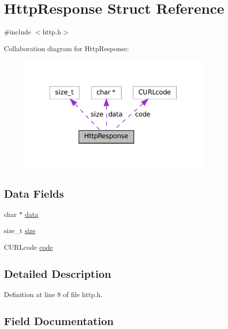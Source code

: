 \hypertarget{struct_http_response}{}\section{Http\+Response Struct Reference}
\label{struct_http_response}


{\ttfamily \#include $<$http.\+h$>$}



Collaboration diagram for Http\+Response\+:
\nopagebreak
\begin{figure}[H]
\begin{center}
\leavevmode
\includegraphics[width=274pt]{struct_http_response__coll__graph}
\end{center}
\end{figure}
\subsection*{Data Fields}
\begin{DoxyCompactItemize}
\item 
char $\ast$ \mbox{\hyperlink{struct_http_response_a29b7ecfb11da1af6c7fdd3fe7862901f}{data}}
\item 
size\+\_\+t \mbox{\hyperlink{struct_http_response_a11b910682b365528a15fcfd6d4dd824f}{size}}
\item 
C\+U\+R\+Lcode \mbox{\hyperlink{struct_http_response_abce68ae6776a536dce762f0b6a96ab54}{code}}
\end{DoxyCompactItemize}


\subsection{Detailed Description}


Definition at line 8 of file http.\+h.



\subsection{Field Documentation}
\mbox{\label{struct_http_response_abce68ae6776a536dce762f0b6a96ab54}} 
